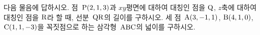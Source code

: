 다음 물음에 답하시오.
 점~$\mathrm{P}(2{,}\mkern3mu\mathopen{}1{,}\mkern3mu\mathopen{}3)$과 $xy$평면에 대하여 대칭인 점을 $\mathrm{Q}$, $z$축에 대하여 대칭인 점을 $\mathrm{R}$라 할 때, 선분~$\mathrm{QR}$의 길이를 구하시오.
 세 점~$\mathrm{A}(3{,}\mkern3mu\mathopen{}-1{,}\mkern3mu\mathopen{}1)$, $\mathrm{B}(4{,}\mkern3mu\mathopen{}1{,}\mkern3mu\mathopen{}0)$, $\mathrm{C}(1{,}\mkern3mu\mathopen{}1{,}\mkern3mu\mathopen{}-3)$을 꼭짓점으로 하는 삼각형~$\mathrm{ABC}$의 넓이를 구하시오.
